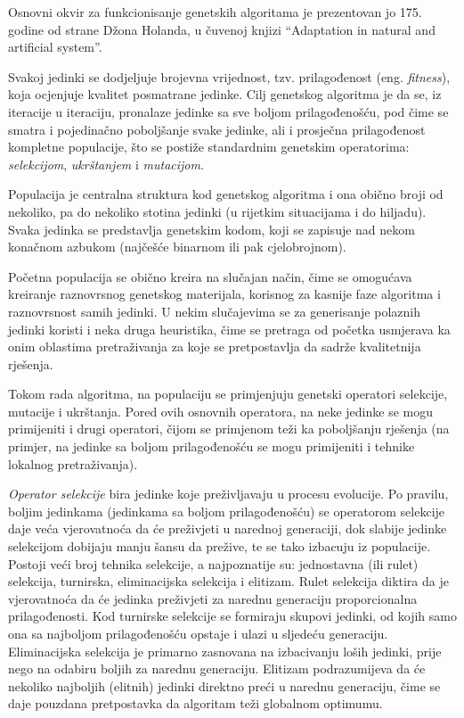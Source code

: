 \documentclass[a4paper, utf8, 11pt, colorlinks]{book}
\theoremstyle{definition}
\begin{document}
Osnovni okvir za funkcionisanje genetskih algoritama je prezentovan jo 175. godine od strane Džona Holanda, u čuvenoj knjizi ``Adaptation in natural and artificial system''.

Svakoj jedinki se dodjeljuje brojevna vrijednost, tzv. prilagođenost (eng.  \emph{fitness}), koja ocjenjuje kvalitet posmatrane jedinke. Cilj genetskog algoritma je da se, iz iteracije u iteraciju, pronalaze jedinke sa sve boljom prilagođenošću, pod čime se smatra i pojedinačno poboljšanje svake jedinke, ali i prosječna prilagođenost kompletne populacije, što se postiže standardnim genetskim operatorima: \textit{selekcijom}, \textit{ukrštanjem} i \textit{mutacijom}.

Populacija je centralna struktura kod genetskog algoritma i ona  obično broji od nekoliko, pa do nekoliko stotina jedinki (u rijetkim situacijama i do hiljadu). Svaka jedinka se predstavlja genetskim kodom, koji se zapisuje nad nekom konačnom azbukom (najčešće binarnom ili pak cjelobrojnom).


Početna populacija se obično kreira na slučajan način, čime se omogućava kreiranje raznovrsnog genetskog materijala, korisnog za kasnije faze algoritma i raznovrsnost samih jedinki. U nekim slučajevima se za generisanje polaznih jedinki koristi i neka druga heuristika, čime se pretraga od početka usmjerava ka onim oblastima pretraživanja za koje se pretpostavlja da sadrže kvalitetnija rješenja.

Tokom rada algoritma, na populaciju se primjenjuju genetski operatori selekcije, mutacije i ukrštanja. Pored ovih osnovnih operatora, na neke jedinke se mogu primijeniti i drugi operatori, čijom se primjenom teži ka poboljšanju rješenja (na primjer, na jedinke sa boljom prilagođenošću se mogu primijeniti i tehnike lokalnog  pretraživanja).

\emph{Operator selekcije} bira jedinke koje preživljavaju u procesu evolucije. Po pravilu, boljim jedinkama (jedinkama sa boljom prilagođenošću) se operatorom selekcije daje veća vjerovatnoća da će preživjeti u narednoj generaciji, dok  slabije jedinke selekcijom dobijaju manju šansu da prežive, te se tako izbacuju iz populacije. Postoji veći broj tehnika selekcije, a najpoznatije su: jednostavna (ili rulet) selekcija, turnirska, eliminacijska selekcija i elitizam. Rulet selekcija diktira da je vjerovatnoća da će jedinka preživjeti za narednu generaciju proporcionalna prilagođenosti. Kod turnirske selekcije se formiraju skupovi jedinki, od kojih samo ona sa najboljom prilagođenošću opstaje i ulazi u sljedeću generaciju. Eliminacijska selekcija je primarno zasnovana na izbacivanju loših jedinki, prije nego na odabiru boljih za narednu generaciju. Elitizam podrazumijeva da će nekoliko najboljih (elitnih) jedinki direktno preći u narednu generaciju, čime se daje pouzdana pretpostavka da  algoritam teži globalnom optimumu.
\end{document}
